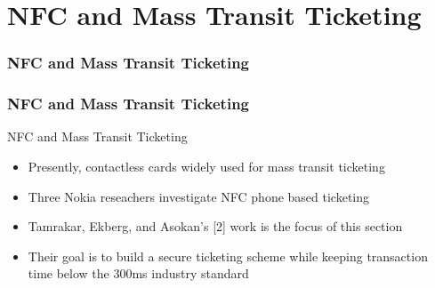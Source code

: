 \documentclass[unknownkeysallowed]{beamer}
\begin{document}
\section{NFC and Mass Transit Ticketing}
\begin{frame}
\frametitle{NFC and Mass Transit Ticketing}
\begin{center}\begin{minipage}{.9\textwidth}
\tableofcontents[currentsubsection, hideothersubsections, sectionstyle=show/shaded]
\end{minipage}\end{center}
\end{frame}
%

\begin{frame}
\frametitle{NFC and Mass Transit Ticketing}
  \begin{center}
  \begin{minipage}{.9\textwidth}
  \begin{block}{NFC and Mass Transit Ticketing}
    \begin{itemize}
      \item{Presently, contactless cards widely used for mass transit ticketing}
      \pause
      \vspace{1mm}
      \item{Three Nokia reseachers investigate NFC phone based ticketing}
      \pause
      \vspace{1mm}
      \item{Tamrakar, Ekberg, and Asokan's [2] work is the focus of this section}
      \pause
      \vspace{1mm}
      \item{Their goal is to build a secure ticketing scheme while keeping transaction time below the 300ms industry standard}
    \end{itemize}
  \end{block}
  \end{minipage}
  \end{center}
\end{frame}
\end{document}
